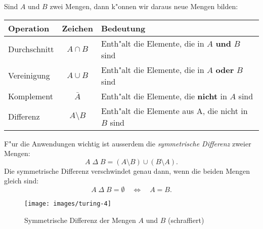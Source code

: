 Sind $A$ und $B$ zwei Mengen, dann k"onnen wir daraus neue Mengen
bilden:
\begin{center}
\begin{tabular}{|l|c|l|}
\hline
Operation&Zeichen&Bedeutung\\
\hline
\index{Durchschnitt}
Durchschnitt&$A\cap B$&Enth"alt die Elemente, die in $A$ {\bf und} $B$ sind\\
\index{Vereinigung}
Vereinigung&$A\cup B$&Enth"alt die Elemente, die in $A$ {\bf oder} $B$ sind\\
\index{Komplement}
Komplement&$\bar A$&Enth"alt die Elemente, die {\bf nicht} in $A$ sind\\
\index{Differenz}
Differenz&$A\setminus B$&Enth"alt die Elemente aus A, die nicht in $B$ sind\\
\hline
\end{tabular}
\end{center}
F"ur die Anwendungen wichtig ist ausserdem die {\em symmetrische Differenz}
zweier Mengen: 
\[
A{\;\Delta\;}B = (A\setminus B)\cup (B\setminus A).
\]
Die symmetrische Differenz verschwindet genau dann, wenn die beiden
Mengen gleich sind:
\[
A{\;\Delta\;}B = \emptyset
\quad\Leftrightarrow\quad
A=B.
\]
\begin{figure}
\begin{center}
\texttt{[image: images/turing-4]}
\end{center}
\caption{Symmetrische Differenz der Mengen $A$ und $B$ (schraffiert)
\label{symdiff}}
\end{figure}

